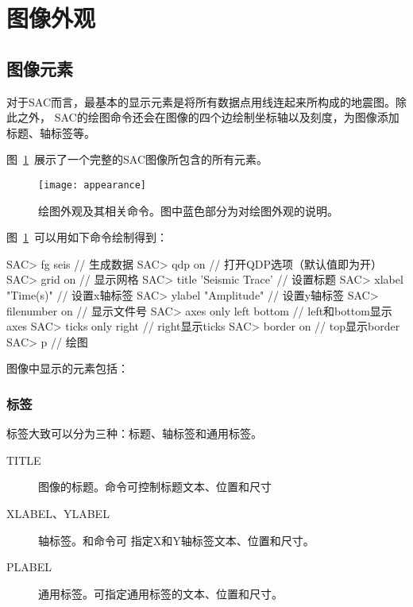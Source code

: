 \section{图像外观}
\label{sec:plot-appearance}

\subsection{图像元素}
对于SAC而言，最基本的显示元素是将所有数据点用线连起来所构成的地震图。除此之外，
SAC的绘图命令还会在图像的四个边绘制坐标轴以及刻度，为图像添加标题、轴标签等。

图~\ref{fig:plot-appearance}~展示了一个完整的SAC图像所包含的所有元素。

\begin{figure}[H]
\centering
\texttt{[image: appearance]}
\caption[绘图外观相关命令]{绘图外观及其相关命令。图中蓝色部分为对绘图外观的说明。}
\label{fig:plot-appearance}
\end{figure}

图~\ref{fig:plot-appearance}~可以用如下命令绘制得到：
\begin{SACCode}
SAC> fg seis                // 生成数据
SAC> qdp on                 // 打开QDP选项（默认值即为开）
SAC> grid on                // 显示网格                                          
SAC> title 'Seismic Trace'  // 设置标题                                          
SAC> xlabel "Time(s)"       // 设置x轴标签                                          
SAC> ylabel "Amplitude"     // 设置y轴标签                                       
SAC> filenumber on          // 显示文件号                                       
SAC> axes only left bottom  // left和bottom显示axes
SAC> ticks only right       // right显示ticks    
SAC> border on              // top显示border                                     
SAC> p                      // 绘图
\end{SACCode}

图像中显示的元素包括：
\subsubsection{标签}
标签大致可以分为三种：标题、轴标签和通用标签。
\begin{description}
\item[TITLE] 图像的标题。命令可控制标题文本、位置和尺寸
\item[XLABEL、YLABEL] 轴标签。和命令可
    指定X和Y轴标签文本、位置和尺寸。
\item[PLABEL] 通用标签。可指定通用标签的文本、位置和尺寸。
\end{description}

